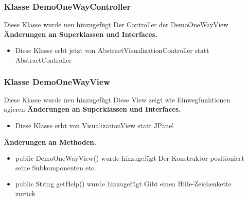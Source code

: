 \documentclass{article}
\begin{document}
	\subsubsection{Klasse DemoOneWayController}
    Diese Klasse wurde neu hinzugefügt
    Der Controller der DemoOneWayView
	    \textbf{Änderungen an Superklassen und Interfaces.}\newline
	   \begin{itemize}
            \item Diese Klasse erbt jetzt von AbstractVisualizationController statt AbstractController\newline
           \end{itemize}

	\subsubsection{Klasse DemoOneWayView}
    Diese Klasse wurde neu hinzugefügt
    Diese View zeigt wie Einwegfunktionen agieren
	    \textbf{Änderungen an Superklassen und Interfaces.}\newline
	   \begin{itemize}
            \item Diese Klasse erbt von VisualizationView statt JPanel
           \end{itemize}
    \textbf{Änderungen an Methoden.}\newline
	   \begin{itemize}
           \item public DemoOneWayView() wurde hinzugefügt\newline
               Der Konstruktor positioniert seine Subkomponenten etc.
           \item public String getHelp() wurde hinzugefügt\newline
               Gibt einen Hilfe-Zeichenkette zurück
           \end{itemize}
\end{document}
